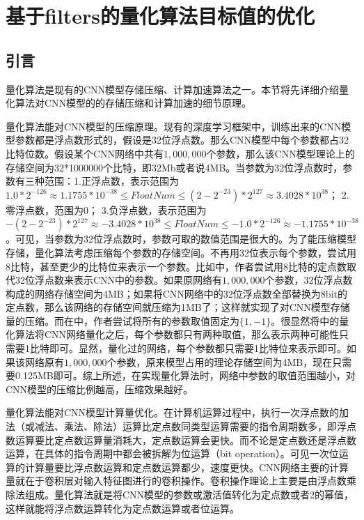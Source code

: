 \documentclass[ pdftex, oneside, master]{NJUthesis}
\begin{document}
\chapter{基于filters的量化算法目标值的优化}

\section{引言}

量化算法是现有的CNN模型存储压缩、计算加速算法之一。本节将先详细介绍量化算法对CNN模型的的存储压缩和计算加速的细节原理。

量化算法能对CNN模型的压缩原理。现有的深度学习框架中，训练出来的CNN模型参数都是浮点数形式的，假设是32位浮点数。那么CNN模型中每个参数都占32比特位数。假设某个CNN网络中共有$1,000,000$个参数，那么该CNN模型理论上的存储空间为32*1000000个比特，即32Mb或者说4MB。当参数为32位浮点数时，参数有三种范围：1.正浮点数，表示范围为$1.0*2^{-126} \approx 1.1755*10^{-38} \leq FloatNum \leq (2-2^{-23})*2^{127} \approx 3.4028*10^{38}$； 2.零浮点数，范围为0； 3.负浮点数，表示范围为$-(2-2^{-23})*2^{127} \approx -3.4028*10^{38} \leq FloatNum \leq -1.0*2^{-126} \approx -1.1755*10^{-38}$。可见，当参数为32位浮点数时，参数可取的数值范围是很大的。为了能压缩模型存储，量化算法考虑压缩每个参数的存储空间。不再用32位表示每个参数，尝试用8比特，甚至更少的比特位来表示一个参数。比如\cite{quantization}中，作者尝试用8比特的定点数取代32位浮点数来表示CNN中的参数。如果原网络有$1,000,000$个参数，32位浮点数构成的网络存储空间为4MB；如果将CNN网络中的32位浮点数全部替换为8bit的定点数，那么该网络的存储空间就压缩为1MB了；这样就实现了对CNN模型存储量的压缩。而在\cite{binary}中，作者尝试将所有的参数取值固定为$\{1, -1\}$。很显然将\cite{binary}中的量化算法将CNN网络量化之后，每个参数都只有两种取值，那么表示两种可能性只需要1比特即可。显然，\cite{binary}量化过的网络，每个参数都只需要1比特位来表示即可。如果该网络原有$1,000,000$个参数，原来模型占用的理论存储空间为4MB，现在只需要0.125MB即可。综上所述，在实现量化算法时，网络中参数的取值范围越小，对CNN模型的压缩比例越高，压缩效果越好。

量化算法能对CNN模型计算量优化。在计算机运算过程中，执行一次浮点数的加法（或减法、乘法、除法）运算比定点数同类型运算需要的指令周期数多，即浮点数运算要比定点数运算量消耗大，定点数运算会更快。而不论是定点数还是浮点数运算，在具体的指令周期中都会被拆解为位运算（bit operation）。可见一次位运算的计算量要比浮点数运算和定点数运算都少，速度更快。CNN网络主要的计算量就在于卷积层对输入特征图进行的卷积操作。卷积操作理论上主要是由浮点数乘除法组成。量化算法就是将CNN模型的参数或激活值转化为定点数或者2的幂值，这样就能将浮点数运算转化为定点数运算或者位运算。
\end{document}
